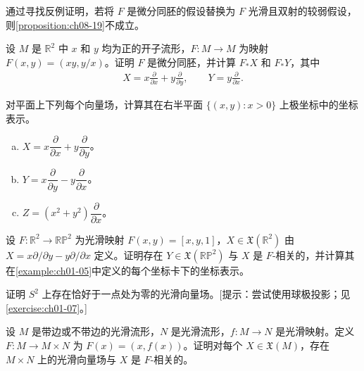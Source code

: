 \documentclass[../../main.tex]{subfiles}
\begin{document}
\begin{exercise}\label{exercise:ch08-09}
通过寻找反例证明，若将 $F$ 是微分同胚的假设替换为 $F$ 光滑且双射的较弱假设，则\cref{proposition:ch08-19}不成立。
\end{exercise}

\begin{exercise}\label{exercise:ch08-10}
设 $M$ 是 $\mathbb{R}^2$ 中 $x$ 和 $y$ 均为正的开子流形，$F\colon M\to M$ 为映射 $F(x,y)=(xy,y/x)$。证明 $F$ 是微分同胚，并计算 $F_*X$ 和 $F_*Y$，其中
\begin{align*}
X=x\frac{\partial}{\partial x}+y\frac{\partial}{\partial y},\qquad
Y=y\frac{\partial}{\partial x}.
\end{align*}
\end{exercise}

\begin{exercise}\label{exercise:ch08-11}
对平面上下列每个向量场，计算其在右半平面 $\{(x,y):x>0\}$ 上极坐标中的坐标表示。
\begin{enumerate}[(a)]
\item $X=x\dfrac{\partial}{\partial x}+y\dfrac{\partial}{\partial y}$。
\item $Y=x\dfrac{\partial}{\partial y}-y\dfrac{\partial}{\partial x}$。
\item $Z=(x^2+y^2)\dfrac{\partial}{\partial x}$。
\end{enumerate}
\end{exercise}

\begin{exercise}\label{exercise:ch08-12}
设 $F\colon\mathbb{R}^2\to\mathbb{RP}^2$ 为光滑映射 $F(x,y)=[x,y,1]$，$X\in\mathfrak{X}(\mathbb{R}^2)$ 由 $X=x\partial/\partial y-y\partial/\partial x$ 定义。证明存在 $Y\in\mathfrak{X}(\mathbb{RP}^2)$ 与 $X$ 是 $F$-相关的，并计算其在\cref{example:ch01-05}中定义的每个坐标卡下的坐标表示。
\end{exercise}

\begin{exercise}\label{exercise:ch08-13}
证明 $S^2$ 上存在恰好于一点处为零的光滑向量场。[提示：尝试使用球极投影；见\cref{exercise:ch01-07}。]
\end{exercise}

\begin{exercise}\label{exercise:ch08-14}
设 $M$ 是带边或不带边的光滑流形，$N$ 是光滑流形，$f\colon M\to N$ 是光滑映射。定义 $F\colon M\to M\times N$ 为 $F(x)=(x,f(x))$。证明对每个 $X\in\mathfrak{X}(M)$，存在 $M\times N$ 上的光滑向量场与 $X$ 是 $F$-相关的。
\end{exercise}
\end{document}
